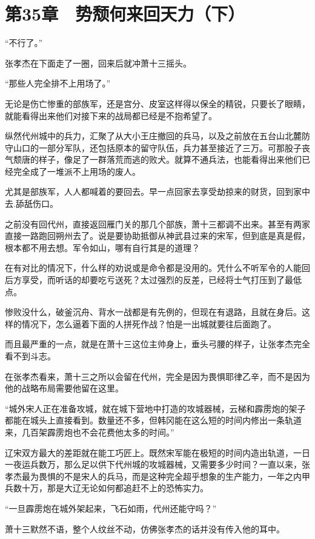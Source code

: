 \section{第35章　势颓何来回天力（下）}

“不行了。”

张孝杰在下面走了一圈，回来后就冲萧十三摇头。

“那些人完全排不上用场了。”

无论是伤亡惨重的部族军，还是宫分、皮室这样得以保全的精锐，只要长了眼睛，就能看得出来他们对接下来的战局都已经是不抱希望了。

纵然代州城中的兵力，汇聚了从大小王庄撤回的兵马，以及之前放在五台山北麓防守山口的一部分军队，还包括原本的留守队伍，兵力甚至接近了三万。可那股子丧气颓唐的样子，像足了一群落荒而逃的败犬。就算不通兵法，也能看得出来他们已经完全成了一堆派不上用场的废人。

尤其是部族军，人人都喊着的要回去。早一点回家去享受劫掠来的财货，回到家中去.舔舐伤口。

之前没有回代州，直接返回雁门关的那几个部族，萧十三都调不出来。甚至有两家直接一路跑回朔州去了。说是要协助抵御从神武县过来的宋军，但到底是真是假，根本都不用去想。军令如山，哪有自行其是的道理？

在有对比的情况下，什么样的劝说或是命令都是没用的。凭什么不听军令的人能回后方享受，而听话的却要吃亏送死？太过强烈的反差，已经将士气打压到了最低点。

惨败没什么，破釜沉舟、背水一战都是有先例的，但现在有退路，且就在身后。这样的情况下，怎么逼着下面的人拼死作战？怕是一出城就要往后面跑了。

而且最严重的一点，就是在萧十三这位主帅身上，垂头弓腰的样子，让张孝杰完全看不到斗志。

在张孝杰看来，萧十三之所以会留在代州，完全是因为畏惧耶律乙辛，而不是因为他的战略布局需要他留在这里。

“城外宋人正在准备攻城，就在城下营地中打造的攻城器械，云梯和霹雳炮的架子都能在城头上直接看到。数量还不多，但韩冈能在这么短的时间内修出一条轨道来，几百架霹雳炮也不会花费他太多的时间。”

辽宋双方最大的差距就在能工巧匠上。既然宋军能在极短的时间内造出轨道，一日一夜运兵数万，那么足以供下代州城的攻城器械，又需要多少时间？一直以来，张孝杰最为畏惧的不是宋人的兵马，而是这种完全超乎想象的生产能力，一年之内甲兵数十万，那是大辽无论如何都追赶不上的恐怖实力。

“一旦霹雳炮在城外架起来，飞石如雨，代州还能守吗？”

萧十三默然不语，整个人纹丝不动，仿佛张孝杰的话并没有传入他的耳中。

